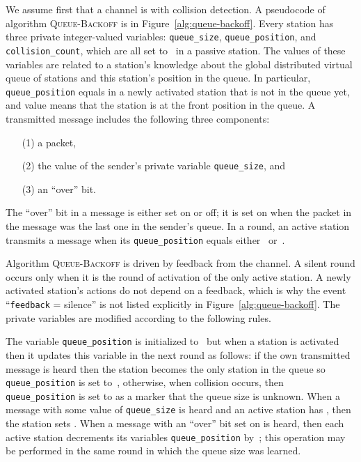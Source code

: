 \documentclass[11pt]{article}
\begin{document}
We assume first that a channel is with collision detection.
A pseudocode of algorithm \textsc{Queue-Backoff} is in Figure~\ref{alg:queue-backoff}.
Every station has three private integer-valued variables: \texttt{queue\_size}, \texttt{queue\_position}, and \texttt{collision\_count}, which are all set to~ in a passive station.
The values of these variables are related to a station's knowledge about the global distributed virtual queue of stations and this station's position in the queue.
In particular, \texttt{queue\_position} equals  in a newly activated station that is not in the queue yet, and value  means that the station is at the front position in the queue.
A  transmitted message includes the following three components: 
\begin{enumerate}
\item[(1)] a packet, 
\item[(2)] the value of the sender's private variable \texttt{queue\_size}, and 
\item[(3)] an ``over'' bit.
\end{enumerate}
The ``over'' bit in a message is either set on or off; it is set on when the packet in the message was the last one in the sender's queue.
In a round, an active station  transmits a message when its \texttt{queue\_position} equals either~ or~.

Algorithm \textsc{Queue-Backoff} is driven by feedback from the channel.
A silent round occurs only when it is the round of activation of the only active station.
A newly activated station's actions do not depend on a feedback, which is why the event ``\texttt{feedback} = silence'' is not listed explicitly in Figure~\ref{alg:queue-backoff}.
The private variables are modified according to the following rules.

The variable \texttt{queue\_position} is initialized to~ but when a station is activated then it updates this variable in the next round as follows: if the own transmitted message is heard then the station becomes the only station in the queue so \texttt{queue\_position} is set to~, otherwise, when collision occurs, then \texttt{queue\_position} is set to  as a marker that the queue size is unknown.
When a message with some value  of \texttt{queue\_size} is heard and an active station has , then the station sets   .
When a message with an ``over'' bit set on is heard, then each active station decrements its variables \texttt{queue\_position}  by~; this operation may be performed in the same round in which the queue size was learned.
\end{document}
